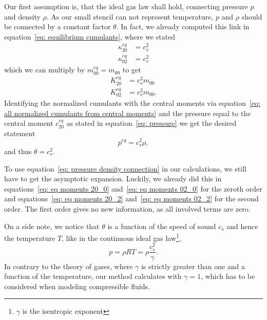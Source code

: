 Our first assumption is, that the ideal gas law shall hold, connecting pressure $p$ and density $\rho$.
As our small stencil can not represent temperature, $p$ and $\rho$ should be connected by a constant factor $\theta$.
In fact, we already computed this link in equation~\eqref{eq: equilibrium cumulants}, where we stated
\begin{equation}
  \begin{aligned}
    \kappa_{20}^{eq} & = c_s^2  \\
    \kappa_{02}^{eq} & = c_s^2
  \end{aligned}
\end{equation}
which we can multiply by $m_{00}^{eq} = m_{00}$ to get
\begin{equation}
\label{eq: pressure density connection}
  \begin{aligned}
    K_{20}^{eq} & = c_s^2 m_{00}  \\
    K_{02}^{eq} & = c_s^2 m_{00}.
  \end{aligned}
\end{equation}
Identifying the normalized cumulants with the central moments via equation~\eqref{eq: all normalized cumulants from central moments} and the pressure equal to the central moment $c_{20}^{eq}$ as stated in equation~\eqref{eq: pressure} we get the desired statement
\begin{equation}
\label{eq: pressure density connection quantities}
  p^{eq}  = c_s^2 \rho,
\end{equation}
and thus $\theta=c_s^2$.

To use equation~\eqref{eq: pressure density connection} in our calculations, we still have to get the asymptotic expansion.
Luckily, we already did this in equations~\eqref{eq: eq moments 20_0} and~\eqref{eq: eq moments 02_0} for the zeroth order and equations~\eqref{eq: eq moments 20_2} and~\eqref{eq: eq moments 02_2} for the second order.
The first order gives no new information, as all involved terms are zero.

On a side note, we notice that $\theta$ is a function of the speed of sound $c_s$ and hence the temperature $T$, like in the continuous ideal gas law\footnote{$\gamma$ is the isentropic exponent },
\begin{equation}
  p=\rho RT = \rho \frac{c_s^2}{\gamma}.
\end{equation}
In contrary to the theory of gases, where $\gamma$ is strictly greater than one and a function of the temperature, our method calculates with $\gamma=1$, which has to be considered when modeling compressible fluids.
